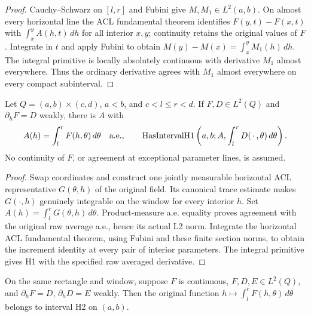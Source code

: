 \begin{proof}
\leanok
Cauchy--Schwarz on $[l,r]$ and Fubini give $M,M_1\in L^2(a,b)$.
On almost every horizontal line the ACL fundamental theorem identifies
$F(y,t)-F(x,t)$ with $\int_x^y A(h,t)\,dh$ for all interior $x,y$;
continuity retains the original values of $F$.
Integrate in $t$ and apply Fubini to obtain
$M(y)-M(x)=\int_x^y M_1(h)\,dh$.
The integral primitive is locally absolutely continuous with derivative
$M_1$ almost everywhere. Thus the ordinary derivative agrees with $M_1$
almost everywhere on every compact subinterval.
\end{proof}

\begin{lemma}
\label{lem:fixed-window-h1-rough}
\leanok
Let $Q=(a,b)\times(c,d)$, $a<b$, and $c<l\le r<d$.
If $F,D\in L^2(Q)$ and $\partial_hF=D$ weakly, there is $A$ with
\[
 A(h)=\int_l^r F(h,\theta)\,d\theta\quad\hbox{a.e.},\qquad
 \operatorname{HasIntervalH1}\left(a,b;A,\int_l^r D(\,\cdot\,,\theta)\,d\theta\right).
\]
No continuity of $F$, or agreement at exceptional parameter lines, is assumed.
\end{lemma}

\begin{proof}
\leanok
Swap coordinates and construct one jointly measurable horizontal ACL
representative $G(\theta,h)$ of the original field.
Its canonical trace estimate makes $G(\cdot,h)$ genuinely integrable on
the window for every interior $h$.
Set $A(h)=\int_l^rG(\theta,h)\,d\theta$.
Product-measure a.e. equality proves agreement with the original raw average
a.e., hence its actual L2 norm.
Integrate the horizontal ACL fundamental theorem, using Fubini and these
finite section norms, to obtain the increment identity at every pair of
interior parameters. The integral primitive gives H1 with the specified
raw averaged derivative.
\end{proof}

\begin{lemma}
\label{lem:fixed-window-h2}
\leanok
On the same rectangle and window, suppose $F$ is continuous,
$F,D,E\in L^2(Q)$, and $\partial_hF=D$, $\partial_hD=E$ weakly.
Then the original function $h\mapsto\int_l^rF(h,\theta)\,d\theta$
belongs to interval H2 on $(a,b)$.
\end{lemma}

